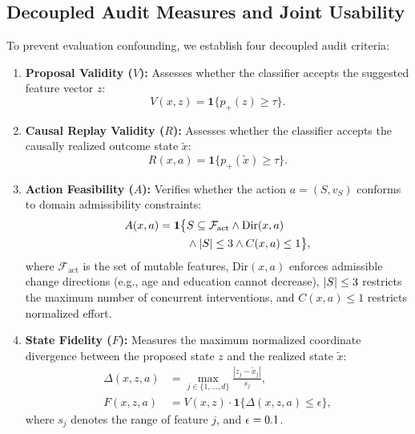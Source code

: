 \documentclass[nolineno]{paper/ieee-access/ieeeaccess}%
\newcommand{\ind}{\ensuremath{\mathbf{1}}}
\begin{document}
\subsection{Decoupled Audit Measures and Joint Usability}
To prevent evaluation confounding, we establish four decoupled audit criteria:
\begin{enumerate}
\item \textbf{Proposal Validity ($V$):} Assesses whether the classifier accepts the suggested feature vector $z$:
\begin{equation}
  V(x, z) = \ind\{p_+(z) \ge \tau\}.
  \label{eq:valid}
\end{equation}
\item \textbf{Causal Replay Validity ($R$):} Assesses whether the classifier accepts the causally realized outcome state $\widetilde{x}$:
\begin{equation}
  R(x, a) = \ind\{p_+(\widetilde{x}) \ge \tau\}.
  \label{eq:replay_valid}
\end{equation}
\item \textbf{Action Feasibility ($A$):} Verifies whether the action $a=(S, v_S)$ conforms to domain admissibility constraints:
\begin{align}
  A(x, a) = \ind\bigl\{&S \subseteq \mathcal{F}_{\mathrm{act}} \land \mathrm{Dir}(x, a) \nonumber \\
  &\land |S| \le \MaxActions \land C(x, a) \le 1\bigr\},
  \label{eq:feasibility}
\end{align}
where $\mathcal{F}_{\mathrm{act}}$ is the set of mutable features, $\mathrm{Dir}(x, a)$ enforces admissible change directions (e.g., age and education cannot decrease), $|S| \le 3$ restricts the maximum number of concurrent interventions, and $C(x, a) \le 1$ restricts normalized effort.
\item \textbf{State Fidelity ($F$):} Measures the maximum normalized coordinate divergence between the proposed state $z$ and the realized state $\widetilde{x}$:
\begin{align}
  \Delta(x, z, a) &= \max_{j \in \{1, \dots, d\}} \frac{|z_j - \widetilde{x}_j|}{s_j}, \label{eq:gap} \\
  F(x, z, a) &= V(x, z) \cdot \ind\{\Delta(x, z, a) \le \epsilon\}, \label{eq:fidelity}
\end{align}
where $s_j$ denotes the range of feature $j$, and $\epsilon = 0.1$.
\end{enumerate}
\end{document}
